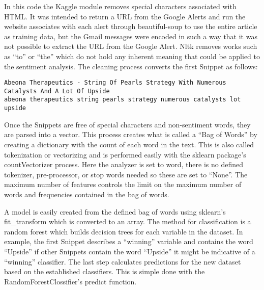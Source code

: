 \documentclass[sigconf]{acmart}
\begin{document}
In this code the Kaggle module removes special characters associated with HTML. It was intended to return a URL from the Google Alerts and run the website associates with each alert through beautiful-soup to use the entire article as training data, but the Gmail messages were encoded in such a way that it was not possible to extract the URL from the Google Alert. Nltk removes works such as ``to'' or ``the'' which do not hold any inherent meaning that could be applied to the sentiment analysis. The cleaning process converts the first Snippet as follows:
\begin{mdframed}[style=default]
\begin{lstlisting}
Abeona Therapeutics - String Of Pearls Strategy With Numerous Catalysts And A Lot Of Upside
abeona therapeutics string pearls strategy numerous catalysts lot upside
\end{lstlisting}
\end{mdframed}

Once the Snippets are free of special characters and non-sentiment words, they are parsed into a vector. This process creates what is called a ``Bag of Words'' by creating a dictionary with the count of each word in the text. This is also called tokenization or vectorizing and is performed easily with the sklearn package's countVectorizer process. Here the analyzer is set to word, there is no defined tokenizer, pre-processor, or stop words needed so these are set to ``None''. The maximum number of features controls the limit on the maximum number of words and frequencies contained in the bag of words. 

A model is easily created from the defined bag of words using sklearn's fit\_transform which is converted to an array. The method for classification is a random forest which builds decision trees for each variable in the dataset. In example, the first Snippet describes a ``winning'' variable and contains the word ``Upside'' if other Snippets contain the word ``Upside'' it might be indicative of a ``winning'' classifier. The last step calculates predictions for the new dataset based on the established classifiers. This is simple done with the RandomForestClossifier's predict function.
\end{document}
